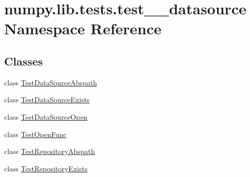 \hypertarget{namespacenumpy_1_1lib_1_1tests_1_1test____datasource}{}\section{numpy.\+lib.\+tests.\+test\+\_\+\+\_\+datasource Namespace Reference}
\label{namespacenumpy_1_1lib_1_1tests_1_1test____datasource}
\subsection*{Classes}
\begin{DoxyCompactItemize}
\item 
class \hyperlink{classnumpy_1_1lib_1_1tests_1_1test____datasource_1_1TestDataSourceAbspath}{Test\+Data\+Source\+Abspath}
\item 
class \hyperlink{classnumpy_1_1lib_1_1tests_1_1test____datasource_1_1TestDataSourceExists}{Test\+Data\+Source\+Exists}
\item 
class \hyperlink{classnumpy_1_1lib_1_1tests_1_1test____datasource_1_1TestDataSourceOpen}{Test\+Data\+Source\+Open}
\item 
class \hyperlink{classnumpy_1_1lib_1_1tests_1_1test____datasource_1_1TestOpenFunc}{Test\+Open\+Func}
\item 
class \hyperlink{classnumpy_1_1lib_1_1tests_1_1test____datasource_1_1TestRepositoryAbspath}{Test\+Repository\+Abspath}
\item 
class \hyperlink{classnumpy_1_1lib_1_1tests_1_1test____datasource_1_1TestRepositoryExists}{Test\+Repository\+Exists}
\end{DoxyCompactItemize}
